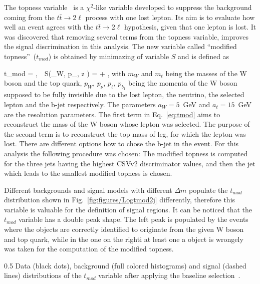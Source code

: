 The topness variable~\cite{Graesser:2012qy} is a $\chi^{2}$-like variable developed to suppress the background coming from the $t \bar{t} \to 2\ell$ process with one lost lepton. Its aim is to evaluate how well an event agrees with the $t \bar{t} \to 2\ell$ hypothesis, given that one lepton is lost. It was discovered that removing several terms from the topness variable, improves the signal discrimination in this analysis. The new variable called ``modified topness''~($t_{mod}$) is obtained by minimazing of variable $S$ and is defined as 


{
 t_{mod} = ,~~S(_{W}, p_{\nu, z} ) =  + ,
}
with $m_{W}$ and  $m_{t}$ being the masses of the W boson and the top quark, ${p}_{W}$, ${p}_{\nu}$, ${p}_{\ell}$, ${p}_{b_{1}}$ being the momenta of the W boson supposed to be fully invisible due to the lost lepton, the neutrino, the selected lepton and the b-jet respectively. The parameters $a_{W} =5$~GeV and $a_{t}=15$~GeV are the resolution parameters. The first term in Eq.~\ref{eq:tmod} aims to reconstruct the mass of the W boson whose lepton was selected. The purpose of the second term is to reconstruct the top mass of leg, for which the lepton was lost. There are different options how to chose the  b-jet in the event. For this analysis the following procedure was chosen: The modified topness is computed for the three jets having the highest CSVv2 discriminator values, and then the jet which leads to the smallest modified topness is chosen.

Different backgrounds and signal models with different $\Delta m$ populate the $t_{mod}$ distribution shown in Fig.~\ref{fig:figures/Logtmod2j} differently, therefore this variable is valuable for the definition of signal regions. It can be noticed that the $t_{mod}$ variable has a double peak shape. The left peak is populated by the events where the objects are correctly identified to originate from the given W boson and top quark, while in the one on the righti at least one a object is wrongely was taken for the computation of the modified topness.

                 {0.5}       %
                 { Data (black dots), background (full colored histograms) and signal (dashed lines) distributions of the $t_{mod}$  variable after applying the baseline selection~\cite{website:stopSupp}. }

